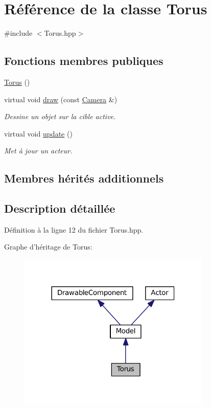 \hypertarget{classTorus}{\section{Référence de la classe Torus}
\label{classTorus}
}


{\ttfamily \#include $<$Torus.\+hpp$>$}

\subsection*{Fonctions membres publiques}
\begin{DoxyCompactItemize}
\item 
\hyperlink{classTorus_ac1767993341e35d3a38676727a80047e}{Torus} ()
\item 
virtual void \hyperlink{classTorus_a4d7971c04def3d60c37b1018560dcfb2}{draw} (const \hyperlink{classCamera}{Camera} \&)
\begin{DoxyCompactList}\small\item\em Dessine un objet sur la cible active. \end{DoxyCompactList}\item 
virtual void \hyperlink{classTorus_ac63e15f0274b1beb5e8f7f968c2ac69f}{update} ()
\begin{DoxyCompactList}\small\item\em Met à jour un acteur. \end{DoxyCompactList}\end{DoxyCompactItemize}
\subsection*{Membres hérités additionnels}


\subsection{Description détaillée}


Définition à la ligne 12 du fichier Torus.\+hpp.



Graphe d'héritage de Torus\+:
\nopagebreak
\begin{figure}[H]
\begin{center}
\leavevmode
\includegraphics[width=260pt]{classTorus__inherit__graph}
\end{center}
\end{figure}


